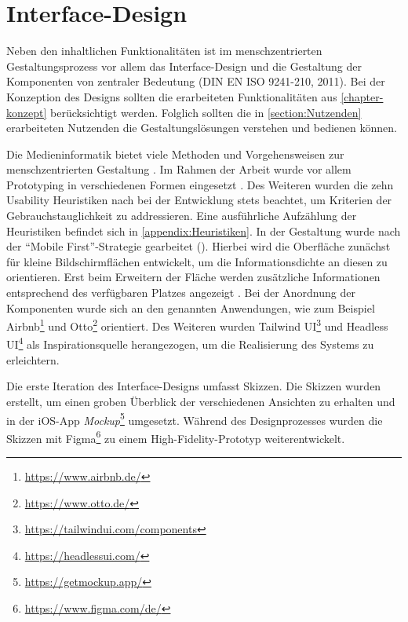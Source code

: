 \chapter{Interface-Design}
\label{chapter-design}
Neben den inhaltlichen Funktionalitäten ist im menschzentrierten
Gestaltungsprozess vor allem das Interface-Design und die Gestaltung der
Komponenten von zentraler Bedeutung \cite{DINISO9241} (DIN EN ISO 9241-210,
2011). Bei der Konzeption des Designs sollten die erarbeiteten Funktionalitäten
aus \ref{chapter-konzept} berücksichtigt werden. Folglich sollten die in
\ref{section:Nutzenden} erarbeiteten Nutzenden die Gestaltungslösungen verstehen
und bedienen können.

Die Medieninformatik bietet viele Methoden und Vorgehensweisen zur menschzentrierten Gestaltung
\cite{HerczegIDE2009}. Im Rahmen der Arbeit wurde vor allem Prototyping in verschiedenen Formen
eingesetzt \cite{HerczegMDI2009}. Des Weiteren wurden die zehn Usability Heuristiken nach
 bei der Entwicklung stets beachtet, um Kriterien der
Gebrauchstauglichkeit zu addressieren. Eine ausführliche Aufzählung der Heuristiken befindet sich in
\ref{appendix:Heuristiken}. In der Gestaltung wurde nach der \enquote{Mobile First}-Strategie
gearbeitet (). Hierbei wird die Oberfläche zunächst für kleine Bildschirmflächen
entwickelt, um die Informationsdichte an diesen zu orientieren. Erst beim Erweitern der Fläche
werden zusätzliche Informationen entsprechend des verfügbaren Platzes angezeigt
\cite{kim_chapter_2013}. Bei der Anordnung der Komponenten wurde sich an den
 genannten Anwendungen, wie zum Beispiel
Airbnb\footnote{\url{https://www.airbnb.de/}} und Otto\footnote{\url{https://www.otto.de/}}
orientiert. Des Weiteren wurden Tailwind UI\footnote{\url{https://tailwindui.com/components}} und
Headless UI\footnote{\url{https://headlessui.com/}} als Inspirationsquelle herangezogen, um die
Realisierung des Systems zu erleichtern.

Die erste Iteration des Interface-Designs umfasst Skizzen. Die Skizzen wurden
erstellt, um einen groben Überblick der verschiedenen Ansichten zu erhalten und
in der iOS-App \textit{Mockup}\footnote{\url{https://getmockup.app/}} umgesetzt. Während des
Designprozesses wurden die Skizzen mit
Figma\footnote{\url{https://www.figma.com/de/}} zu einem High-Fidelity-Prototyp
weiterentwickelt.


